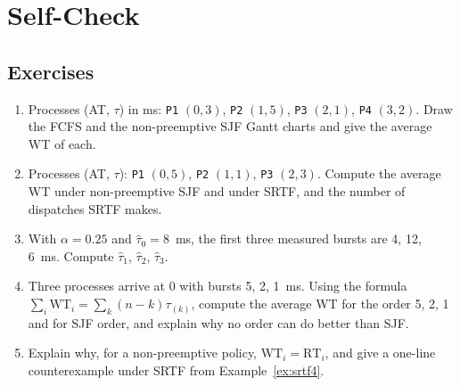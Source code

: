 \documentclass[11pt]{article}
\begin{document}
\section*{Self-Check}

\subsection*{Exercises}
\begin{enumerate}
  \item Processes (AT, $\tau$) in ms: \texttt{P1} $(0,3)$, \texttt{P2} $(1,5)$,
        \texttt{P3} $(2,1)$, \texttt{P4} $(3,2)$. Draw the FCFS and the
        non-preemptive SJF Gantt charts and give the average WT of each.
  \item Processes (AT, $\tau$): \texttt{P1} $(0,5)$, \texttt{P2} $(1,1)$,
        \texttt{P3} $(2,3)$. Compute the average WT under non-preemptive SJF and
        under SRTF, and the number of dispatches SRTF makes.
  \item With $\alpha = 0.25$ and $\hat{\tau}_0 = 8$~ms, the first three
        measured bursts are 4, 12, 6~ms. Compute $\hat{\tau}_1$,
        $\hat{\tau}_2$, $\hat{\tau}_3$.
  \item Three processes arrive at 0 with bursts 5, 2, 1~ms. Using the formula
        $\sum_i \mathrm{WT}_i = \sum_k (n-k)\tau_{(k)}$, compute the average WT
        for the order 5, 2, 1 and for SJF order, and explain why no order can do
        better than SJF.
  \item Explain why, for a non-preemptive policy, $\mathrm{WT}_i =
        \mathrm{RT}_i$, and give a one-line counterexample under SRTF from
        Example~\ref{ex:srtf4}.
\end{enumerate}
\end{document}
